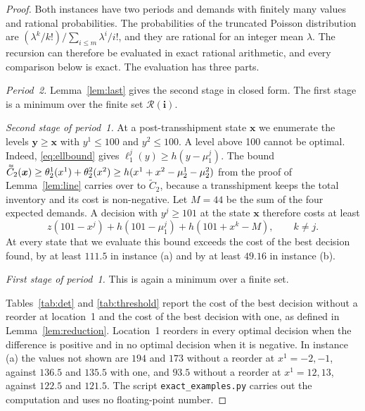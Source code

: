 \documentclass[11pt]{article}
\DeclareRobustCommand{\dbtilde}[1]{\accentset{\approx}{#1}}
\renewcommand{\vec}[1]{\boldsymbol{#1}}
\newcommand{\R}{\mathcal{R}}
\newcommand{\Ct}{\widetilde{C}}
\newcommand{\Cq}{\dbtilde{C}}
\theoremstyle{definition}
\begin{document}
\begin{proof}
Both instances have two periods and demands with finitely many values and rational probabilities. The probabilities of the truncated Poisson distribution are $(\lambda^k/k!)/\sum_{i\le m}\lambda^i/i!$, and they are rational for an integer mean $\lambda$. The recursion can therefore be evaluated in exact rational arithmetic, and every comparison below is exact. The evaluation has three parts.

\emph{Period~2.} Lemma~\ref{lem:last} gives the second stage in closed form. The first stage is a minimum over the finite set $\R(\vec{i})$.

\emph{Second stage of period~1.} At a post-transshipment state $\vec{x}$ we enumerate the levels $\vec{y}\ge\vec{x}$ with $y^1\le100$ and $y^2\le100$. A level above 100 cannot be optimal. Indeed, \eqref{eq:ellbound} gives $\ell^j_1(y)\ge h(y-\mu^j_1)$. The bound $\Cq_2(\vec{x})\ge\theta^1_2(x^1)+\theta^2_2(x^2)\ge h(x^1+x^2-\mu^1_2-\mu^2_2)$ from the proof of Lemma~\ref{lem:line} carries over to $\Ct_2$, because a transshipment keeps the total inventory and its cost is non-negative. Let $M=44$ be the sum of the four expected demands. A decision with $y^j\ge101$ at the state $\vec{x}$ therefore costs at least
\[
z(101-x^j)+h(101-\mu^j_1)+h(101+x^k-M),\qquad k\ne j .
\]
At every state that we evaluate this bound exceeds the cost of the best decision found, by at least $111.5$ in instance (a) and by at least $49.16$ in instance (b).

\emph{First stage of period~1.} This is again a minimum over a finite set.

Tables~\ref{tab:det} and \ref{tab:threshold} report the cost of the best decision without a reorder at location~1 and the cost of the best decision with one, as defined in Lemma~\ref{lem:reduction}. Location~1 reorders in every optimal decision when the difference is positive and in no optimal decision when it is negative. In instance (a) the values not shown are $194$ and $173$ without a reorder at $x^1=-2,-1$, against $136.5$ and $135.5$ with one, and $93.5$ without a reorder at $x^1=12,13$, against $122.5$ and $121.5$. The script \texttt{exact\_examples.py} carries out the computation and uses no floating-point number.
\end{proof}
\end{document}
